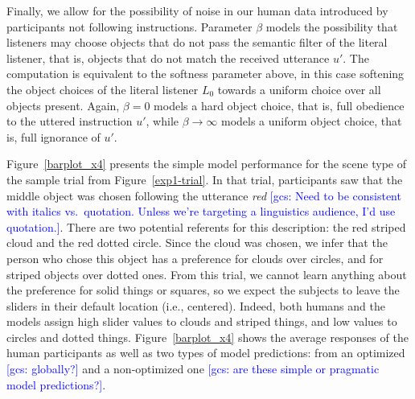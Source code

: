 \documentclass[10pt,a4paper]{article}
\newcommand{\gcs}[1]{\textcolor{blue}{[gcs: #1]}}
\begin{document}

Finally, we allow for the possibility of noise in our human data introduced by participants not following instructions.
Parameter $\beta$ models the possibility that listeners may choose objects that do not pass the semantic filter of the literal listener, that is, objects that do not match the received utterance $u'$. 
The computation is equivalent to the softness parameter above, in this case softening the object choices of the literal listener $L_0$ towards a uniform choice over all objects present. 
Again, $\beta=0$ models a hard object choice, that is, full obedience to the uttered instruction $u'$, 
while $\beta \rightarrow \infty$ models a uniform object choice, that is, full ignorance of $u'$.

Figure~\ref{barplot_x4} presents the simple model performance for the scene type of the sample trial from Figure~\ref{exp1-trial}. In that trial, participants saw that the middle object was chosen following the utterance \textit{red} \gcs{Need to be consistent with italics vs.~quotation. Unless we're targeting a linguistics audience, I'd use quotation.}. There are two potential referents for this description: the red striped cloud and the red dotted circle. Since the cloud was chosen, we infer that the person who chose this object has a preference for clouds over circles, and for striped objects over dotted ones. From this trial, we cannot learn anything about the preference for solid things or squares, so we expect the subjects to leave the sliders in their default location (i.e., centered).
Indeed, both humans and the models assign high slider values to clouds and striped things, and low values to circles and dotted things. 
Figure~\ref{barplot_x4} shows the average responses of the human participants as well as two types of model predictions: from an optimized \gcs{globally?} and a non-optimized one \gcs{are these simple or pragmatic model predictions?}.
\end{document}
